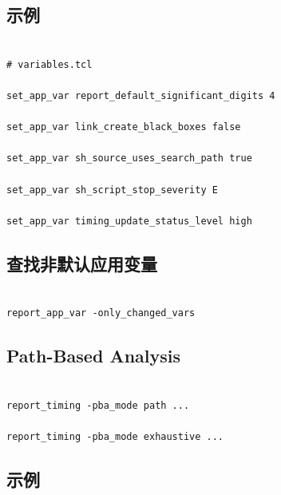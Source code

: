 \subsection{ 示例}

\label{jobaid:variables}



\begin{lstlisting}

# variables.tcl

set_app_var report_default_significant_digits 4

set_app_var link_create_black_boxes false

set_app_var sh_source_uses_search_path true

set_app_var sh_script_stop_severity E

set_app_var timing_update_status_level high

\end{lstlisting}



\subsection{查找非默认应用变量}

\label{jobaid:changed-vars}



\begin{lstlisting}

report_app_var -only_changed_vars

\end{lstlisting}



\subsection{Path-Based Analysis}

\label{jobaid:pba}



\begin{lstlisting}

report_timing -pba_mode path ...

report_timing -pba_mode exhaustive ...

\end{lstlisting}



\subsection{ 示例}

